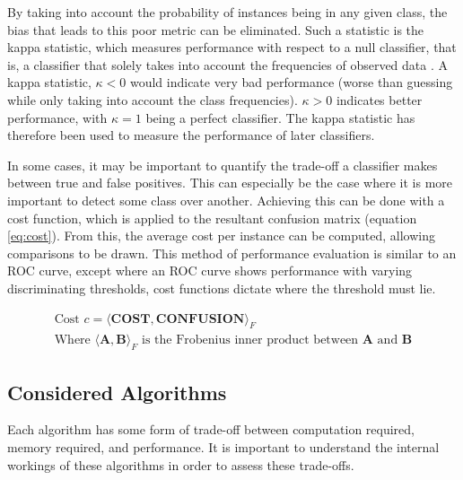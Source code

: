By taking into account the probability of instances being in any given class, the bias that leads to this poor metric can be eliminated. Such a statistic is the kappa statistic, which measures performance with respect to a null classifier, that is, a classifier that solely takes into account the frequencies of observed data \cite{viera2005understanding}. A kappa statistic, $\kappa < 0$  would indicate very bad performance (worse than guessing while only taking into account the class frequencies). $\kappa > 0$ indicates better performance, with $\kappa = 1$ being a perfect classifier. The kappa statistic has therefore been used to measure the performance of later classifiers.

In some cases, it may be important to quantify the trade-off a classifier makes between true and false positives. This can especially be the case where it is more important to detect some class over another. Achieving this can be done with a cost function, which is applied to the resultant confusion matrix (equation \ref{eq:cost}). From this, the average cost per instance can be computed, allowing comparisons to be drawn. This method of performance evaluation is similar to an ROC curve, except where an ROC curve shows performance with varying discriminating thresholds, cost functions dictate where the threshold must lie.

\begin{equation}
	\label{eq:cost}
	\begin{gathered}
		\text{Cost } c = \langle \mathbf{COST}, \mathbf{CONFUSION} \rangle_F \\
		\text{Where $\langle \mathbf{A}, \mathbf{B}\rangle_F$ is the Frobenius inner product between $\mathbf{A}$ and $\mathbf{B}$}
	\end{gathered}
\end{equation}

\subsection{Considered Algorithms}

Each algorithm has some form of trade-off between computation required, memory required, and performance. It is important to understand the internal workings of these algorithms in order to assess these trade-offs.

